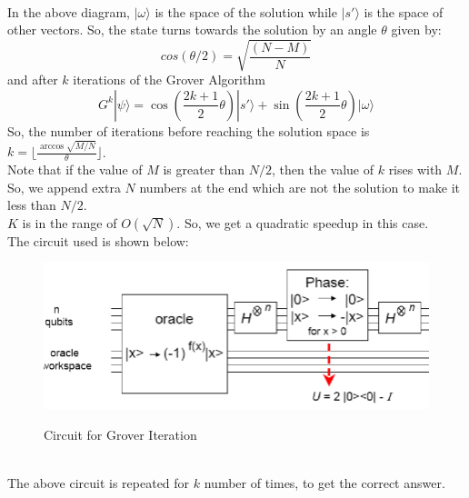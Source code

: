 \\In the above diagram, $|\omega\rangle$ is the space of the solution while $|s'\rangle$ is the space of other vectors. So, the state turns towards the solution by an angle $\theta$ given by:
\begin{equation}
cos(\theta/2) = \sqrt{\frac{(N-M)}{N}}
\end{equation}and after $k$ iterations of the Grover Algorithm
\begin{equation}
G^k|\psi \rangle  = \cos{\left(\frac{2k+1}{2}\theta\right)} |s' \rangle + \sin{\left(\frac{2k+1}{2}\theta\right)}|\omega \rangle
\end{equation}
So, the number of iterations before reaching the solution space is $k = \Bigg\lfloor\frac{ \arccos \sqrt{M/N}}{\theta} \Bigg\rfloor$.\\
Note that if the value of $M$ is greater than $N/2$, then the value of $k$ rises with $M$. So, we append extra $N$ numbers at the end which are not the solution to make it less than $N/2$.\\
$K$ is in the range of $O(\sqrt{N})$. So, we get a quadratic speedup in this case.\\
The circuit used is shown below:
\begin{figure}[h]
\centering
\includegraphics[width=1\textwidth]{images/grovercir.png}
\label{grovercir}
\caption{Circuit for Grover Iteration}
\end{figure}
\\The above circuit is repeated for $k$ number of times, to get the correct answer.
